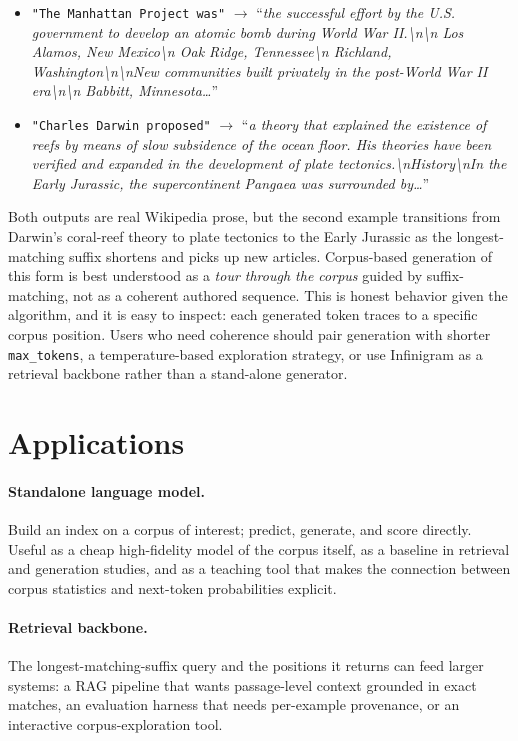 \documentclass[11pt]{article}
\begin{document}
\begin{itemize}
    \item \texttt{"The Manhattan Project was"} $\to$ ``\emph{the successful effort by the U.S. government to develop an atomic bomb during World War II.\textbackslash n\textbackslash n Los Alamos, New Mexico\textbackslash n Oak Ridge, Tennessee\textbackslash n Richland, Washington\textbackslash n\textbackslash nNew communities built privately in the post-World War II era\textbackslash n\textbackslash n Babbitt, Minnesota\ldots}''
    \item \texttt{"Charles Darwin proposed"} $\to$ ``\emph{a theory that explained the existence of reefs by means of slow subsidence of the ocean floor. His theories have been verified and expanded in the development of plate tectonics.\textbackslash nHistory\textbackslash nIn the Early Jurassic, the supercontinent Pangaea was surrounded by\ldots}''
\end{itemize}

Both outputs are real Wikipedia prose, but the second example transitions from Darwin's coral-reef theory to plate tectonics to the Early Jurassic as the longest-matching suffix shortens and picks up new articles. Corpus-based generation of this form is best understood as a \emph{tour through the corpus} guided by suffix-matching, not as a coherent authored sequence. This is honest behavior given the algorithm, and it is easy to inspect: each generated token traces to a specific corpus position. Users who need coherence should pair generation with shorter \texttt{max\_tokens}, a temperature-based exploration strategy, or use Infinigram as a retrieval backbone rather than a stand-alone generator.

\section{Applications}

\paragraph{Standalone language model.}
Build an index on a corpus of interest; predict, generate, and score directly. Useful as a cheap high-fidelity model of the corpus itself, as a baseline in retrieval and generation studies, and as a teaching tool that makes the connection between corpus statistics and next-token probabilities explicit.

\paragraph{Retrieval backbone.}
The longest-matching-suffix query and the positions it returns can feed larger systems: a RAG pipeline that wants passage-level context grounded in exact matches, an evaluation harness that needs per-example provenance, or an interactive corpus-exploration tool.
\end{document}
